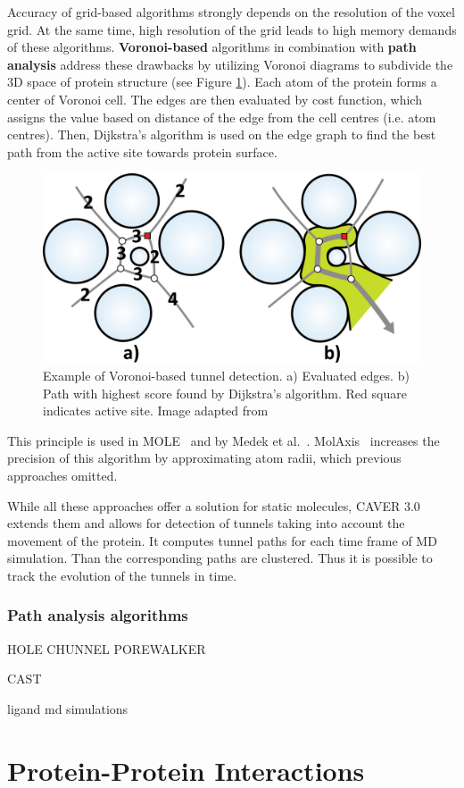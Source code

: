 Accuracy of grid-based algorithms strongly depends on the resolution of the voxel grid. At the same time, high resolution of the grid leads to high memory demands of these algorithms. \textbf{Voronoi-based} algorithms in combination with \textbf{path analysis} address these drawbacks by utilizing Voronoi diagrams to subdivide the 3D space of protein structure (see Figure \ref{Fig:voronoi}). Each atom of the protein forms a center of Voronoi cell. The edges are then evaluated by cost function, which assigns the value based on distance of the edge from the cell centres (i.e. atom centres). Then, Dijkstra's algorithm is used on the edge graph to find the best path from the active site towards protein surface. 

\begin{figure}[H]
  \centering
  \includegraphics[width=0.6\linewidth]{pictures/voronoi.pdf} 
  \caption{Example of Voronoi-based tunnel detection. a) Evaluated edges. b) Path with highest score found by Dijkstra's algorithm. Red square indicates active site. Image adapted from \cite{caver20}}
  \label{Fig:voronoi}  
\end{figure} 

This principle is used in MOLE~\cite{Petrek2007MOLE} and by Medek et al.~\cite{caver20}. MolAxis~\cite{Yaffe2008MolAxis} increases the precision of this algorithm by approximating atom radii, which previous approaches omitted.

While all these approaches offer a solution for static molecules, CAVER 3.0~\cite{caver30} extends them and allows for detection of tunnels taking into account the movement of the protein. It computes tunnel paths for each time frame of MD simulation. Than the corresponding paths are clustered. Thus it is possible to track the evolution of the tunnels in time.

\subsubsection{Path analysis algorithms}
HOLE \cite{Smart1996Hole}
CHUNNEL \cite{Coleman2009CHUNNEL}
POREWALKER \cite{Pellegrini2009PoreWalker}
 




CAST \cite{liang1998anatomy}

ligand md simulations

\section{Protein-Protein Interactions}
